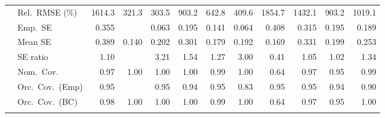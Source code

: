 \begin{landscape}
\begin{longtable}{llrrrrrrrrrr}
 & Rel.\ RMSE (\%) & 1614.3 & \cellcolor{ranktwo}321.3 & \cellcolor{rankone}303.5 & 903.2 & 642.8 & \cellcolor{rankthree}409.6 & 1854.7 & 1432.1 & 903.2 & 1019.1 \\
 & Emp.\ SE & 0.355 &  & 0.063 & 0.195 & 0.141 & 0.064 & 0.408 & 0.315 & 0.195 & 0.189 \\
 & Mean SE & 0.389 & 0.140 & 0.202 & 0.301 & 0.179 & 0.192 & 0.169 & 0.331 & 0.199 & 0.253 \\
 & SE ratio & \cellcolor{rankthree}1.10 &  & 3.21 & 1.54 & 1.27 & 3.00 & 0.41 & \cellcolor{ranktwo}1.05 & \cellcolor{rankone}1.02 & 1.34 \\
 & Nom.\ Cov. & \cellcolor{ranktwo}0.97 & 1.00 & 1.00 & 1.00 & \cellcolor{rankthree}0.99 & 1.00 & 0.64 & \cellcolor{ranktwo}0.97 & \cellcolor{rankone}0.95 & \cellcolor{rankthree}0.99 \\
 & Orc.\ Cov.\ (Emp) & \cellcolor{rankone}0.95 &  & \cellcolor{rankone}0.95 & \cellcolor{ranktwo}0.94 & \cellcolor{rankone}0.95 & 0.83 & \cellcolor{rankone}0.95 & \cellcolor{rankone}0.95 & \cellcolor{ranktwo}0.94 & \cellcolor{rankthree}0.90 \\
 & Orc.\ Cov.\ (BC) & \cellcolor{rankthree}0.98 & 1.00 & 1.00 & 1.00 & 0.99 & 1.00 & 0.64 & \cellcolor{ranktwo}0.97 & \cellcolor{rankone}0.95 & 1.00 \\
\addlinespace[2pt]
\end{longtable}
\end{landscape}

